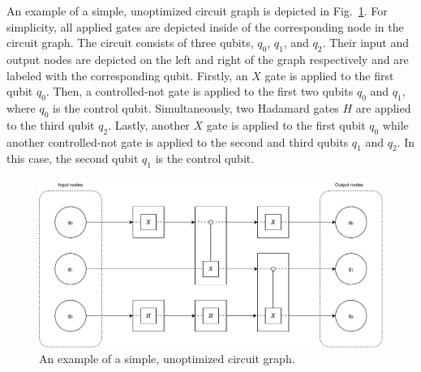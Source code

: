 An example of a simple, unoptimized circuit graph is depicted in Fig.~\ref{fig:circuit_graph_unoptimized}. For simplicity, all applied gates are depicted inside of the corresponding node in the circuit graph. The circuit consists of three qubits, $q_0$, $q_1$, and $q_2$. Their input and output nodes are depicted on the left and right of the graph respectively and are labeled with the corresponding qubit. Firstly, an $X$ gate is applied to the first qubit $q_0$. Then, a controlled-not gate is applied to the first two qubits $q_0$ and $q_1$, where $q_0$ is the control qubit. Simultaneously, two Hadamard gates $H$ are applied to the third qubit $q_2$. Lastly, another $X$ gate is applied to the first qubit $q_0$ while another controlled-not gate is applied to the second and third qubits $q_1$ and $q_2$. In this case, the second qubit $q_1$ is the control qubit.

\begin{figure}[htp]
    \centering     
    \includegraphics[width=.9\textwidth]{../figures/circuit_graph_unoptimized.pdf}
    \caption{An example of a simple, unoptimized circuit graph.}
    \label{fig:circuit_graph_unoptimized}
\end{figure}

